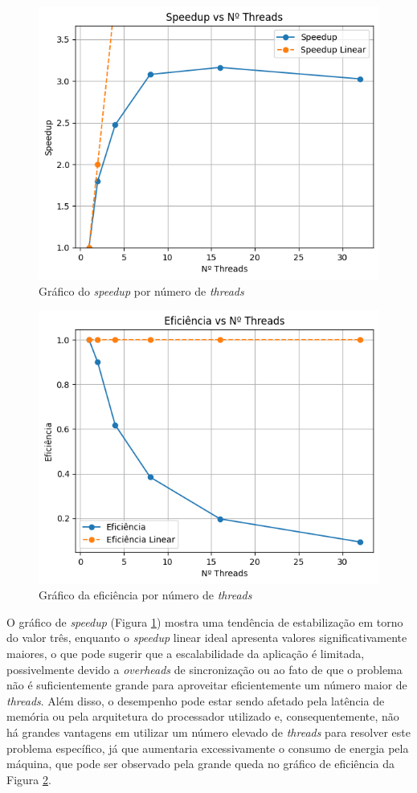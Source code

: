 \documentclass[12pt]{article}
\begin{document}
\begin{figure}[ht]
\centering
\includegraphics[width=.5\textwidth]{figs/speedupxthreads.png}
\caption{Gráfico do \textit{speedup} por número de \textit{threads}}
\label{fig:speedupOMP}
\end{figure}

\begin{figure}[ht]
\centering
\includegraphics[width=.5\textwidth]{figs/eficienciaxthreads.png}
\caption{Gráfico da eficiência por número de \textit{threads}}
\label{fig:eficienciaOMP}
\end{figure}


O gráfico de \textit{speedup} (Figura \ref{fig:speedupOMP}) mostra uma tendência de estabilização em torno do valor três, enquanto o \textit{speedup} linear ideal apresenta valores significativamente maiores, o que pode sugerir que a escalabilidade da aplicação é limitada, possivelmente devido a \textit{overheads} de sincronização ou ao fato de que o problema não é suficientemente grande para aproveitar eficientemente um número maior de \textit{threads}. Além disso, o desempenho pode estar sendo afetado pela latência de memória ou pela arquitetura do processador utilizado e, consequentemente, não há grandes vantagens em utilizar um número elevado de \textit{threads} para resolver este problema específico, já que aumentaria excessivamente o consumo de energia pela máquina, que pode ser observado pela grande queda no gráfico de eficiência da Figura \ref{fig:eficienciaOMP}.
\end{document}
